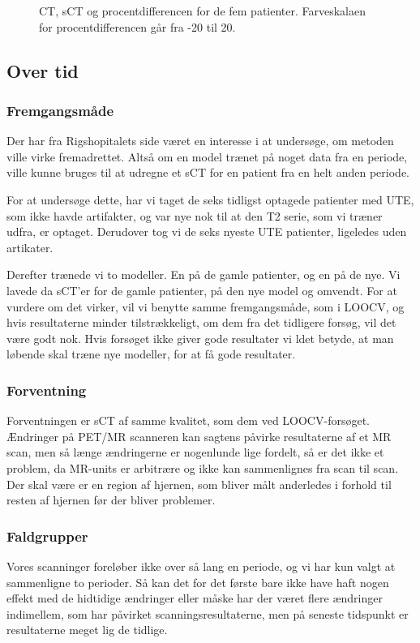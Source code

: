 \begin{figure}
\begin{subfigure}[b]{0.3\textwidth}
        \label{col:loocv_pet_pat5_pd}
    \end{subfigure}
    \caption{CT, sCT og procentdifferencen for de fem patienter. Farveskalaen for procentdifferencen går fra -20 til 20.}
    \label{col:loocv_pet}
\end{figure}

\subsection{Over tid}
\subsubsection{Fremgangsmåde}

Der har fra Rigshopitalets side været en interesse i at undersøge, om
metoden ville virke fremadrettet. Altså om en model trænet på noget data
fra en periode, ville kunne bruges til at udregne et sCT for en patient
fra en helt anden periode. 

For at undersøge dette, har vi taget de seks
tidligst optagede patienter med UTE, som ikke havde artifakter, og
var nye nok til at den T2 serie, som vi træner udfra, er optaget.
Derudover tog vi de seks nyeste UTE patienter, ligeledes uden artikater.


Derefter trænede vi to modeller. En på de gamle patienter, og en på de
nye. Vi lavede da sCT'er for de gamle patienter, på den nye model og
omvendt. For at vurdere om det virker, vil vi benytte samme fremgangsmåde,
som i LOOCV, og hvis resultaterne minder tilstrækkeligt, om dem fra det
tidligere forsøg, vil det være godt nok. Hvis forsøget ikke giver gode
resultater vi ldet betyde, at man løbende skal træne nye modeller, for at
få gode resultater.

\subsubsection{Forventning}

Forventningen er sCT af samme kvalitet, som dem ved LOOCV-forsøget.
Ændringer på PET/MR scanneren kan sagtens påvirke resultaterne af et MR
scan, men så længe ændringerne er nogenlunde lige fordelt, så er det ikke
et problem, da MR-units er arbitrære og ikke kan sammenlignes fra scan til
scan. Der skal være er en region af hjernen, som bliver målt anderledes i
forhold til resten af hjernen før der bliver problemer.

\subsubsection{Faldgrupper}

Vores scanninger foreløber ikke over så lang en periode, og vi har
kun valgt at sammenligne to perioder. Så kan det for det første
bare ikke have haft nogen effekt med de hidtidige ændringer eller
måske har der været flere ændringer indimellem, som har påvirket
scanningsresultaterne, men på seneste tidspunkt er resultaterne meget
lig de tidlige.